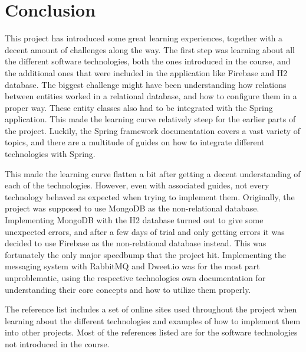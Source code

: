 \section{Conclusion}

This project has introduced some great learning experiences, together with a decent amount of challenges along the way. The first step was learning about all the different software technologies, both the ones introduced in the course, and the additional ones that were included in the application like Firebase and H2 database. The biggest challenge might have been understanding how relations between entities worked in a relational database, and how to configure them in a proper way. These entity classes also had to be integrated with the Spring application. This made the learning curve relatively steep for the earlier parts of the project. Luckily, the Spring framework documentation covers a vast variety of topics, and there are a multitude of guides on how to integrate different technologies with Spring.

This made the learning curve flatten a bit after getting a decent understanding of each of the technologies. However, even with associated guides, not every technology behaved as expected when trying to implement them. Originally, the project was supposed to use MongoDB \cite{mongodb} as the non-relational database. Implementing MongoDB with the H2 database turned out to give some unexpected errors, and after a few days of trial and only getting errors it was decided to use Firebase as the non-relational database instead. This was fortunately the only major speedbump that the project hit. Implementing the messaging system with RabbitMQ and Dweet.io was for the most part unproblematic, using the respective technologies own documentation for understanding their core concepts and how to utilize them properly. 

The reference list includes a set of online sites used throughout the project when learning about the different technologies and examples of how to implement them into other projects. Most of the references listed are for the software technologies not introduced in the course.

